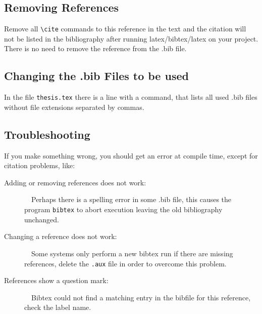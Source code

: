 \subsection{Removing References} \label{section:removingreferences}

Remove all \verb+\cite+ commands to this reference in the text and
the citation will not be listed in the bibliography after running
latex/bibtex/latex on your project. There is no need to remove the
reference from the .bib file.

\subsection{Changing the .bib Files to be used}

In the file \texttt{thesis.tex} there is a line with a
\verb++ command, that lists all used .bib files without
file extensions separated by commas.

\subsection{Troubleshooting}

If you make something wrong, you should get an error at compile
time, except for citation problems, like:

\begin{description}
\item[Adding or removing references does not work:]~~Perhaps there is
a spelling error in some .bib file, this causes the program
\texttt{bibtex} to abort execution leaving the old bibliography
unchanged.

\item[Changing a reference does not work:]~~Some systems only perform
a new bibtex run if there are missing references, delete the
\texttt{.aux} file in order to overcome this problem.

\item[References show a question mark:]~~Bibtex could not find a
matching entry in the bibfile for this reference, check the label
name.

\end{description}



